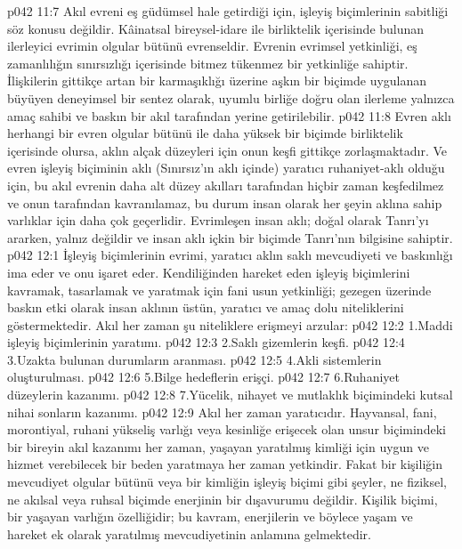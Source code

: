 \vs p042 11:7 Akıl evreni eş güdümsel hale getirdiği için, işleyiş biçimlerinin sabitliği söz konusu değildir. Kâinatsal bireysel\hyp{}idare ile birliktelik içerisinde bulunan ilerleyici evrimin olgular bütünü evrenseldir. Evrenin evrimsel yetkinliği, eş zamanlılığın sınırsızlığı içerisinde bitmez tükenmez bir yetkinliğe sahiptir. İlişkilerin gittikçe artan bir karmaşıklığı üzerine aşkın bir biçimde uygulanan büyüyen deneyimsel bir sentez olarak, uyumlu birliğe doğru olan ilerleme yalnızca amaç sahibi ve baskın bir akıl tarafından yerine getirilebilir.
\vs p042 11:8 Evren aklı herhangi bir evren olgular bütünü ile daha yüksek bir biçimde birliktelik içerisinde olursa, aklın alçak düzeyleri için onun keşfi gittikçe zorlaşmaktadır. Ve evren işleyiş biçiminin aklı (Sınırsız’ın aklı içinde) yaratıcı ruhaniyet\hyp{}aklı olduğu için, bu akıl evrenin daha alt düzey akılları tarafından hiçbir zaman keşfedilmez ve onun tarafından kavranılamaz, bu durum insan olarak her şeyin  aklına sahip varlıklar için daha çok geçerlidir. Evrimleşen insan aklı; doğal olarak Tanrı’yı ararken, yalnız değildir ve insan aklı içkin bir biçimde Tanrı’nın bilgisine sahiptir.
\vs p042 12:1 İşleyiş biçimlerinin evrimi, yaratıcı aklın saklı mevcudiyeti ve baskınlığı ima eder ve onu işaret eder. Kendiliğinden hareket eden işleyiş biçimlerini kavramak, tasarlamak ve yaratmak için fani usun yetkinliği; gezegen üzerinde baskın etki olarak insan aklının üstün, yaratıcı ve amaç dolu niteliklerini göstermektedir. Akıl her zaman şu niteliklere erişmeyi arzular:
\vs p042 12:2 1.\bibnobreakspace Maddi işleyiş biçimlerinin yaratımı.
\vs p042 12:3 2.\bibnobreakspace Saklı gizemlerin keşfi.
\vs p042 12:4 3.\bibnobreakspace Uzakta bulunan durumların aranması.
\vs p042 12:5 4.\bibnobreakspace Akli sistemlerin oluşturulması.
\vs p042 12:6 5.\bibnobreakspace Bilge hedeflerin erişçi.
\vs p042 12:7 6.\bibnobreakspace Ruhaniyet düzeylerin kazanımı.
\vs p042 12:8 7.\bibnobreakspace Yücelik, nihayet ve mutlaklık biçimindeki kutsal nihai sonların kazanımı.
\vs p042 12:9 Akıl her zaman yaratıcıdır. Hayvansal, fani, morontiyal, ruhani yükseliş varlığı veya kesinliğe erişecek olan unsur biçimindeki bir bireyin akıl kazanımı her zaman, yaşayan yaratılmış kimliği için uygun ve hizmet verebilecek bir beden yaratmaya her zaman yetkindir. Fakat bir kişiliğin mevcudiyet olgular bütünü veya bir kimliğin işleyiş biçimi gibi şeyler, ne fiziksel, ne akılsal veya ruhsal biçimde enerjinin bir dışavurumu değildir. Kişilik biçimi, bir yaşayan varlığın  özelliğidir; bu kavram, enerjilerin  ve böylece yaşam ve hareket ek olarak yaratılmış mevcudiyetinin  anlamına gelmektedir.
